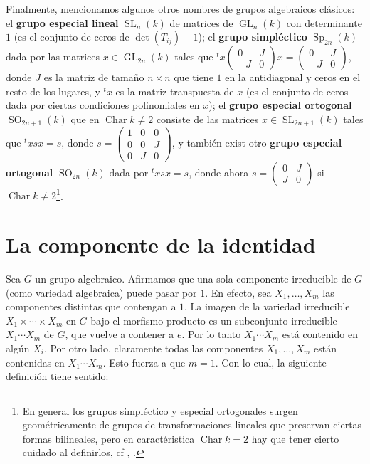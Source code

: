 \documentclass[spanish,10pt]{amsart}
\theoremstyle{definition}
\theoremstyle{remark}
\numberwithin{equation}{section}
\newcommand{\Char}[1]{\operatorname{Char} #1}
\begin{document}
Finalmente, mencionamos algunos otros nombres de grupos algebraicos clásicos: el \textbf{grupo especial lineal} $\operatorname{SL}_n (k)$ de matrices de $\operatorname{GL}_n (k)$ con determinante $1$ (es el conjunto de ceros de $\det (T_{ij}) - 1$); el \textbf{grupo simpléctico} $\operatorname{Sp}_{2n} (k)$ dada por las matrices $x \in \operatorname{GL}_{2n} (k)$ tales que ${}^t x \begin{pmatrix} 0 & J \\ - J & 0 \end{pmatrix} x = \begin{pmatrix} 0 & J \\ - J & 0 \end{pmatrix}$, donde $J$ es la matriz de tamaño $n \times n$ que tiene $1$ en la antidiagonal y ceros en el resto de los lugares, y ${}^t x$ es la matriz transpuesta de $x$ (es el conjunto de ceros dada por ciertas condiciones polinomiales en $x$); el \textbf{grupo especial ortogonal} $\operatorname{SO}_{2n + 1} (k)$ que en $\Char k \neq 2$ consiste de las matrices $x \in \operatorname{SL}_{2n+1} (k)$ tales que ${}^t x s x = s$, donde $s = \begin{pmatrix} 1 & 0 & 0 \\ 0 & 0 & J \\ 0 & J & 0 \end{pmatrix}$, y también exist otro \textbf{grupo especial ortogonal} $\operatorname{SO}_{2n} (k)$ dada por ${}^t x s x = s$, donde ahora $s = \begin{pmatrix} 0 & J \\ J & 0 \end{pmatrix}$ si $\Char k \neq 2$\footnote{En general los grupos simpléctico y especial ortogonales surgen geométricamente de grupos de transformaciones lineales que preservan ciertas formas bilineales, pero en caractéristica $\Char k = 2$ hay que tener cierto cuidado al definirlos, cf \cite{dieudonne1956groupesDeLieEtHyperalgebresDeLieSurUnCorpsDeCaracteristiqueP}, \cite[Ch. 1]{carter1989simpleGroupsOfLieType}.}.




\section{La componente de la identidad}

Sea $G$ un grupo algebraico. Afirmamos que una sola componente irreducible de $G$ (como variedad algebraica) puede pasar por $1$. En efecto, sea $X_1, \ldots, X_m$ las componentes distintas que contengan a $1$. La imagen de la variedad irreducible $X_1 \times \cdots \times X_m$ en $G$ bajo el morfismo producto es un subconjunto irreducible $X_1 \cdots X_m$ de $G$, que vuelve a contener a $e$. Por lo tanto $X_1 \cdots X_m$ está contenido en algún $X_i$. Por otro lado, claramente todas las componentes $X_1, \ldots, X_m$ están contenidas en $X_1 \cdots X_m$. Esto fuerza a que $m = 1$. Con lo cual, la siguiente definición tiene sentido:
\end{document}
